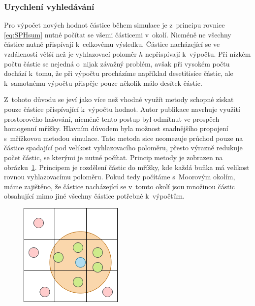 \subsubsection{Urychlení vyhledávání}
Pro výpočet nových hodnot částice během simulace je z~principu rovnice \ref{eq:SPHsum} nutné počítat se všemi částicemi v~okolí. Nicméně ne všechny částice nutně přispívají k~celkovému výsledku. Částice nacházející se ve vzdálenosti větší než je vyhlazovací poloměr $h$ nepřispívají k~výpočtu. Při nízkém počtu částic se nejedná o~nijak závažný problém, avšak při vysokém počtu dochází k~tomu, že při výpočtu procházíme například desetitisíce částic, ale k~samotnému výpočtu přispěje pouze několik málo desítek částic. 

Z~tohoto důvodu se jeví jako více než vhodné využít metody schopné získat pouze částice přispívající k~výpočtu hodnot. Autor publikace \cite{KelagerSPH} navrhuje využití prostorového hašování, nicméně tento postup byl odmítnut ve prospěch homogenní mřížky. Hlavním důvodem byla možnost snadnějšího propojení s~mřížkovou metodou simulace. Tato metoda sice neomezuje průchod pouze na částice spadající pod velikost vyhlazovacího poloměru, přesto výrazně redukuje počet částic, se kterými je nutné počítat. Princip metody je zobrazen na obrázku~\ref{fig:GridSPH}. Principem je rozdělení částic do mřížky, kde každá buňka má velikost rovnou vyhlazovacímu poloměru. Pokud tedy počítáme s~Moorovým okolím, máme zajištěno, že částice nacházející se v~tomto okolí jsou množinou částic obsahující mimo jiné všechny částice potřebné k~výpočtům.

\begin{figure}[hbt]
	\centering
	\captionsetup{justification=centering}
	\includegraphics[scale=0.6]{obrazky-figures/GridSPH.png}
	\label{fig:GridSPH}
\end{figure}

